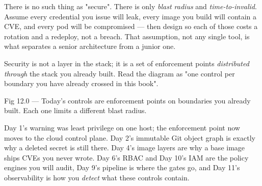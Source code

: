 \begin{keyidea}
There is no such thing as "secure". There is only \emph{blast radius} and \emph{time-to-invalid}. Assume every credential you issue will leak, every image you build will contain a CVE, and every pod will be compromised --- then design so each of those costs a rotation and a redeploy, not a breach. That assumption, not any single tool, is what separates a senior architecture from a junior one.
\end{keyidea}

 Security is not a layer in the stack; it is a set of enforcement points \emph{distributed through} the stack you already built. Read the diagram as "one control per boundary you have already crossed in this book".

\begin{wbfigure}{Fig 12.0 — Today's controls are enforcement points on boundaries you already built. Each one limits a different blast radius.}
\end{wbfigure}

 Day 1's  warning was least privilege on one host; the enforcement point now moves to the cloud control plane. Day 2's immutable Git object graph is exactly why a deleted secret is still there. Day 4's image layers are why a base image ships CVEs you never wrote. Day 6's RBAC and Day 10's IAM are the policy engines you will audit, Day 9's pipeline is where the gates go, and Day 11's observability is how you \emph{detect} what these controls contain.

